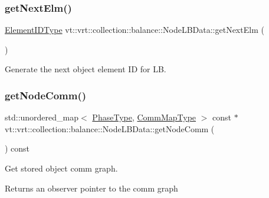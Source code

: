 \subsubsection{\texorpdfstring{get\+Next\+Elm()}{getNextElm()}}
{\footnotesize\ttfamily \hyperlink{namespacevt_1_1vrt_1_1collection_1_1balance_a592736f733df4f90856df90a1fd08905}{Element\+I\+D\+Type} vt\+::vrt\+::collection\+::balance\+::\+Node\+L\+B\+Data\+::get\+Next\+Elm (\begin{DoxyParamCaption}{ }\end{DoxyParamCaption})}



Generate the next object element ID for LB. 

\mbox{\label{structvt_1_1vrt_1_1collection_1_1balance_1_1_node_l_b_data_a01ac3980585c93769570fd4e76ea9218}} 
\subsubsection{\texorpdfstring{get\+Node\+Comm()}{getNodeComm()}\hspace{0.1cm}{\footnotesize\ttfamily [1/2]}}
{\footnotesize\ttfamily std\+::unordered\+\_\+map$<$ \hyperlink{namespacevt_a46ce6733d5cdbd735d561b7b4029f6d7}{Phase\+Type}, \hyperlink{namespacevt_1_1vrt_1_1collection_1_1balance_a01ee1fb0ae2da1d2ab7fdca3be9ae351}{Comm\+Map\+Type} $>$ const  $\ast$ vt\+::vrt\+::collection\+::balance\+::\+Node\+L\+B\+Data\+::get\+Node\+Comm (\begin{DoxyParamCaption}{ }\end{DoxyParamCaption}) const}



Get stored object comm graph. 

\begin{DoxyReturn}{Returns}
an observer pointer to the comm graph 
\end{DoxyReturn}
\mbox{\label{structvt_1_1vrt_1_1collection_1_1balance_1_1_node_l_b_data_a6805869aeb1d424289ddb2b6be653595}} 

